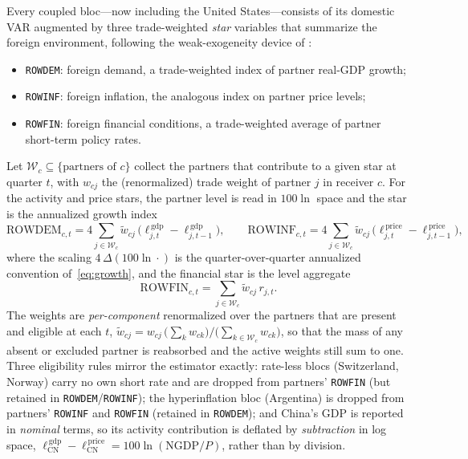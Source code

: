 \documentclass[11pt]{article}
\theoremstyle{definition}
\theoremstyle{remark}
\begin{document}
Every coupled bloc---now including the United States---consists of its domestic
VAR augmented by three trade-weighted \emph{star} variables that summarize the
foreign environment, following the weak-exogeneity device of
\citet{PesaranSchuermannWeiner2004}:
\begin{itemize}
  \item \texttt{ROWDEM}: foreign demand, a trade-weighted index of partner
    real-GDP growth;
  \item \texttt{ROWINF}: foreign inflation, the analogous index on partner
    price levels;
  \item \texttt{ROWFIN}: foreign financial conditions, a trade-weighted average
    of partner short-term policy rates.
\end{itemize}
Let $\mathcal{W}_c \subseteq \{\text{partners of }c\}$ collect the partners that
contribute to a given star at quarter $t$, with $w_{cj}$ the (renormalized)
trade weight of partner $j$ in receiver $c$. For the activity and price stars,
the partner level is read in $100\ln$ space and the star is the annualized
growth index
\begin{equation}\label{eq:gvar:star_growth}
  \text{ROWDEM}_{c,t}
  = 4 \sum_{j \in \mathcal{W}_c}
      \tilde{w}_{cj}\,\bigl(\ell_{j,t}^{\,\text{gdp}} - \ell_{j,t-1}^{\,\text{gdp}}\bigr),
  \qquad
  \text{ROWINF}_{c,t}
  = 4 \sum_{j \in \mathcal{W}_c}
      \tilde{w}_{cj}\,\bigl(\ell_{j,t}^{\,\text{price}} - \ell_{j,t-1}^{\,\text{price}}\bigr),
\end{equation}
where the scaling $4\,\Delta(100\ln\cdot)$ is the quarter-over-quarter
annualized convention of~\eqref{eq:growth}, and the financial star is the
level aggregate
\begin{equation}\label{eq:gvar:star_fin}
  \text{ROWFIN}_{c,t} = \sum_{j \in \mathcal{W}_c} \tilde{w}_{cj}\, r_{j,t}.
\end{equation}
The weights are \emph{per-component} renormalized over the partners that are
present and eligible at each $t$, $\tilde{w}_{cj} = w_{cj}\,
\bigl(\sum_{k} w_{ck}\bigr)\big/\bigl(\sum_{k \in \mathcal{W}_c} w_{ck}\bigr)$,
so that the mass of any absent or excluded partner is reabsorbed and the active
weights still sum to one. Three eligibility rules mirror the estimator exactly:
rate-less blocs (Switzerland, Norway) carry no own short rate and are dropped
from partners' \texttt{ROWFIN} (but retained in \texttt{ROWDEM}/\texttt{ROWINF});
the hyperinflation bloc (Argentina) is dropped from partners' \texttt{ROWINF}
and \texttt{ROWFIN} (retained in \texttt{ROWDEM}); and China's GDP is reported
in \emph{nominal} terms, so its activity contribution is deflated by
\emph{subtraction} in log space, $\ell^{\,\text{gdp}}_{\text{CN}} -
\ell^{\,\text{price}}_{\text{CN}} = 100\ln(\text{NGDP}/P)$, rather than by
division.
\end{document}
